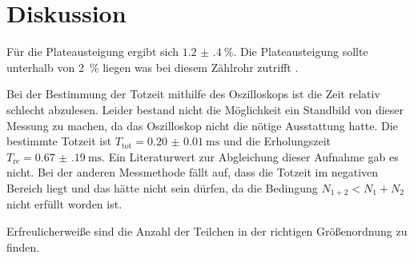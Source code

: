 \section{Diskussion}
Für die Plateausteigung ergibt sich $\SI{1.2(4)}{\%}$. Die Plateausteigung sollte
unterhalb von \SI{2}{\%} liegen was bei diesem Zählrohr zutrifft \cite{2}.

Bei der Bestimmung der Totzeit mithilfe des Oszilloskops ist die Zeit relativ schlecht abzulesen.
Leider bestand nicht die Möglichkeit ein Standbild von dieser Messung zu machen, da das Oszilloskop nicht die nötige
Ausstattung hatte. Die bestimmte Totzeit ist $T_\text{tot} = \SI{0.20(1)}{\milli\second}$
und die Erholungszeit $T_\text{re} = \SI{0.67(19)}{\milli\second}$.
Ein Literaturwert zur Abgleichung dieser Aufnahme gab es nicht.
Bei der anderen Messmethode fällt auf, dass die Totzeit im negativen Bereich liegt und das hätte nicht sein dürfen,
da die Bedingung $N_{1+2} < N_1 + N_2$ nicht erfüllt worden ist.

Erfreulicherweiße sind die Anzahl der Teilchen in der richtigen Größenordnung zu finden.

